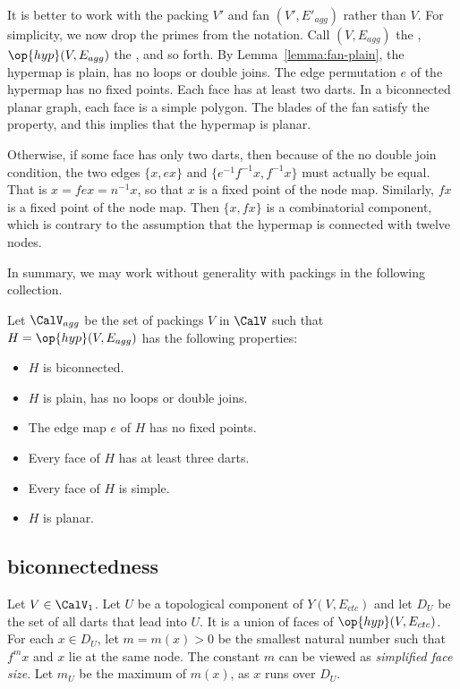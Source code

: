 It is better to work with the packing $V'$ and fan $(V',E'_{agg})$
rather than $V$.  For simplicity, we now drop the primes from the
notation.  Call $(V,E_{agg})$ the ,
$\op{hyp}(V,E_{agg})$ the , and so forth.
By Lemma~\ref{lemma:fan-plain}, the hypermap is plain, has no loops or
double joins.  The edge permutation $e$ of the hypermap has no fixed
points.  Each face has at least two darts.  In a biconnected planar graph, each face is a simple polygon.
The blades of the fan satisfy the  property, and this implies that the hypermap
is planar.

  Otherwise, if some face
has only two darts, then because of the no double join condition, the
two edges $\{x, e x\}$ and $\{ e^{-1} f^{-1} x, f^{-1} x\}$ must actually
be equal.  That is $ x = f e x = n^{-1} x$, so that $x$ is a fixed
point of the node map.  Similarly, $f x$ is a fixed point of the node map.  Then
$\{x, f x\}$ is a combinatorial component, which is contrary to the assumption that
the hypermap is connected with twelve nodes.

In summary, we may work without generality with packings in the following collection.

\begin{definition}[$\CalV_1$]
  Let $\CalV_{agg}$ be the set of packings $V$ in $\CalV$ such that
  $H=\op{hyp}(V,E_{agg})$ has the following properties:
\begin{itemize}
\item $H$ is  biconnected.
\item $H$ is plain, has no loops or double joins.
\item The edge map $e$ of $H$ has no fixed points.
\item Every face of $H$ has at least three darts.
\item Every face of $H$ is simple.
\item $H$ is planar.
\end{itemize}
\end{definition}



\subsection{biconnectedness}

Let $V\in \CalV_1$.  Let $U$ be a topological component of
$Y(V,E_{ctc})$ and let $D_U$ be the set of all darts that lead into
$U$.  It is a union of faces of $\op{hyp}(V,E_{ctc})$.  For each $x\in
D_U$, let $m = m(x) >0$ be the smallest natural number such that $f^m
x$ and $x$ lie at the same node.  The constant $m$ can be viewed as
{\it simplified face size}.  Let $m_U$ be the maximum of $m(x)$, as
$x$ runs over $D_U$.  %
%


